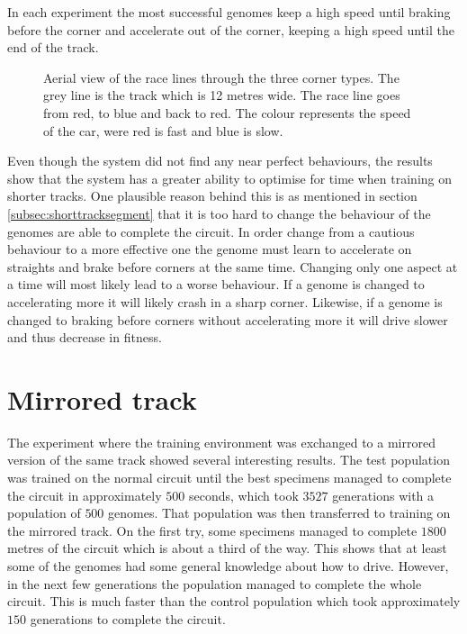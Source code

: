 In each experiment the most successful genomes keep a high speed until braking before the corner and accelerate out of the corner, keeping a high speed until the end of the track. 

\begin{figure}[H]
    \centering
    \qquad
    \qquad

    \caption{Aerial view of the race lines through the three corner types. The grey line is the track which is 12 metres wide. The race line goes from red, to blue and back to red. The colour represents the speed of the car, were red is fast and blue is slow.}
\end{figure}

Even though the system did not find any near perfect behaviours, the results show that the system has a greater ability to optimise for time when training on shorter tracks. One plausible reason behind this is as mentioned in section \ref{subsec:shorttracksegment} that it is too hard to change the behaviour of the genomes are able to complete the circuit. In order change from a cautious behaviour to a more effective one the genome must learn to accelerate on straights and brake before corners at the same time. Changing only one aspect at a time will most likely lead to a worse behaviour. If a genome is changed to accelerating more it will likely crash in a sharp corner. Likewise, if a genome is changed to braking before corners without accelerating more it will drive slower and thus decrease in fitness.  




\section{Mirrored track}
\label{result:mirror}
The experiment where the training environment was exchanged to a mirrored version of the same track showed several interesting results. The test population was trained on the normal circuit until the best specimens managed to complete the circuit in approximately $500$ seconds, which took $3527$ generations with a population of $500$ genomes. That population was then transferred to training on the mirrored track. On the first try, some specimens managed to complete $1800$ metres of the circuit which is about a third of the way. This shows that at least some of the genomes had some general knowledge about how to drive. However, in the next few generations the population managed to complete the whole circuit. This is much faster than the control population which took approximately $150$ generations to complete the circuit. 


